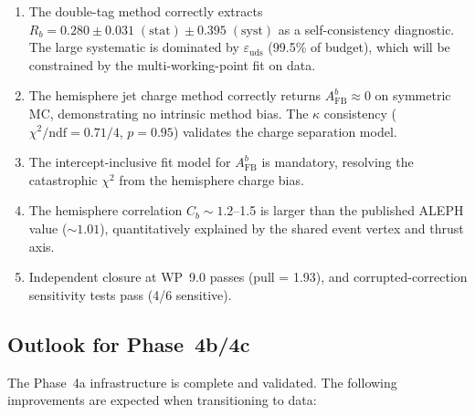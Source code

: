 \documentclass[11pt,a4paper]{article}
\begin{document}
\begin{enumerate}
\item The double-tag method correctly extracts $R_b = 0.280 \pm 0.031\;\mathrm{(stat)}
\pm 0.395\;\mathrm{(syst)}$ as a self-consistency diagnostic. The large systematic
is dominated by $\varepsilon_\mathrm{uds}$ (99.5\% of budget), which will be constrained
by the multi-working-point fit on data.

\item The hemisphere jet charge method correctly returns $A_\mathrm{FB}^b \approx 0$
on symmetric MC, demonstrating no intrinsic method bias. The $\kappa$ consistency
($\chi^2/\mathrm{ndf} = 0.71/4$, $p = 0.95$) validates the charge separation model.

\item The intercept-inclusive fit model for $A_\mathrm{FB}^b$ is mandatory, resolving
the catastrophic $\chi^2$ from the hemisphere charge bias.

\item The hemisphere correlation $C_b \sim 1.2$--1.5 is larger than the published
ALEPH value ($\sim 1.01$), quantitatively explained by the shared event vertex
and thrust axis.

\item Independent closure at WP~9.0 passes (pull = 1.93), and corrupted-correction
sensitivity tests pass (4/6 sensitive).
\end{enumerate}

\subsection{Outlook for Phase~4b/4c}
\label{sec:outlook}

The Phase~4a infrastructure is complete and validated. The following improvements are
expected when transitioning to data:
\end{document}

